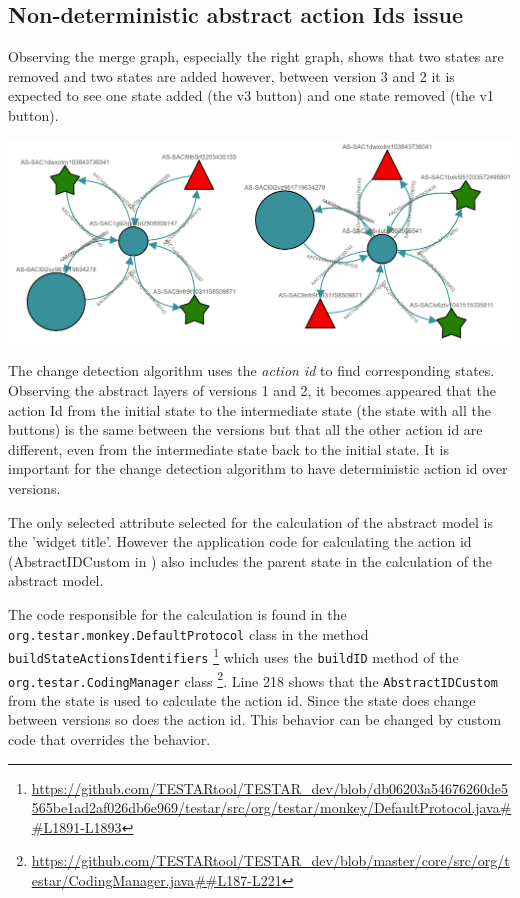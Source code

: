\subsection{Non-deterministic abstract action Ids issue}

Observing the merge graph, especially the right graph, shows that two states are removed and two states are added however, between version 3 and 2 it is expected to see one state added (the v3 button) and one state removed (the v1 button).

\begingroup
\captionsetup{type=figure}
\includegraphics[scale=0.5]{images/6-Wrong-merge.png}
\label{fig:wrong-merge-outcome}
\endgroup

The change detection algorithm uses the \textit{action id} to find corresponding states. Observing the abstract layers of versions 1 and 2, it becomes appeared that the action Id from the initial state to the intermediate state (the state with all the buttons) is the same between the versions but that all the other action id are different, even from the intermediate state back to the initial state. It is important for the change detection algorithm to have deterministic action id over versions. 

The only selected attribute selected for the calculation of the abstract model is the 'widget title'. However the application code for calculating the action id (AbstractIDCustom in \testar) also includes the parent state in the calculation of the abstract model.

The code responsible for the calculation is found in the \verb|org.testar.monkey.DefaultProtocol| class in the method \verb|buildStateActionsIdentifiers| \footnote{\url{https://github.com/TESTARtool/TESTAR_dev/blob/db06203a54676260de5565be1ad2af026db6e969/testar/src/org/testar/monkey/DefaultProtocol.java##L1891-L1893}} which uses the \verb|buildID| method of the \\ \verb|org.testar.CodingManager| class \footnote{\url{https://github.com/TESTARtool/TESTAR_dev/blob/master/core/src/org/testar/CodingManager.java##L187-L221}}. Line 218 shows that the \verb|AbstractIDCustom| from the state is used to calculate the action id. Since the state does change between versions so does the action id. This behavior can be changed by custom code that overrides the behavior. 

